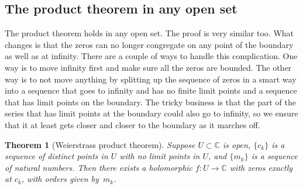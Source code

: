 \documentclass[12pt,openany]{book}
\newcommand{\C}{{\mathbb{C}}}
\theoremstyle{plain}
\newtheorem{thm}{Theorem}[section]
\theoremstyle{remark}
\theoremstyle{definition}
\theoremstyle{exercise}
\theoremstyle{example}
\begin{document}
\subsection{The product theorem in any open set}

The product theorem holds in any open set.  The proof is very similar too.
What changes is that the zeros can no longer congregate on any point of
the boundary as well as at infinity.  There are a couple of ways to handle
this complication.
One way is to move infinity first and make sure all the zeros are bounded.
The other way is to not move anything by splitting up the sequence of zeros in a
smart way into a sequence that goes to infinity and has no finite limit
points and a sequence that has limit points on the boundary.  The tricky
business is that the part of the series that has limit points at the
boundary could also go to infinity, so we ensure that it at least gets
closer and closer to the boundary as it marches off.

\begin{thm}[Weierstrass product theorem]
\label{thm:weierprod}
Suppose $U \subset \C$ is open, $\{ c_k \}$ is
a sequence of distinct points in $U$
with no limit points in $U$, and $\{ m_k \}$ is a sequence of
natural numbers.
Then there exists a holomorphic $f \colon U \to \C$ with
zeros exactly at $c_k$, with orders given by~$m_k$.
\end{thm}
\end{document}
